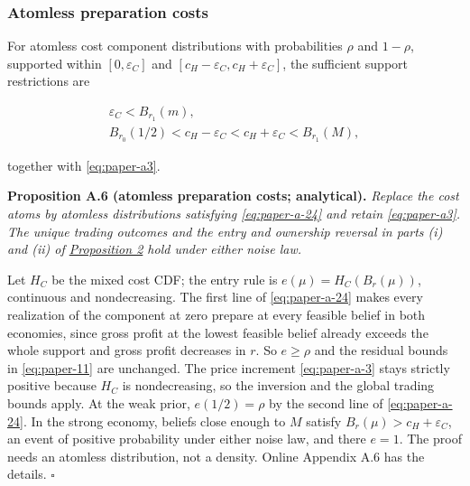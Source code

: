 \subsubsection{Atomless preparation
costs}\label{atomless-preparation-costs}

For atomless cost component distributions with
probabilities \(\rho\) and \(1-\rho\), supported within
\([0,\varepsilon_C]\) and
\([c_H-\varepsilon_C,c_H+\varepsilon_C]\), the sufficient support
restrictions are

\[
\begin{gathered}
\varepsilon_C<B_{r_1}(m),\\
B_{r_0}(1/2)<c_H-\varepsilon_C<c_H+\varepsilon_C<B_{r_1}(M),
\end{gathered}
\tag{A.24}\label{eq:paper-a-24}
\]

together with \eqref{eq:paper-a3}.


\protect{}\label{result-proposition-a-6}{\textbf{Proposition
A.6 (atomless preparation costs; analytical).}} \emph{Replace the cost
atoms by atomless distributions satisfying \eqref{eq:paper-a-24} and
retain \eqref{eq:paper-a3}. The unique trading outcomes and the entry
and ownership reversal in parts (i) and (ii) of
\hyperref[result-proposition-2]{Proposition 2} hold under either noise
law.}

Let \(H_C\) be the mixed cost CDF; the entry rule is
\(e(\mu)=H_C(B_r(\mu))\), continuous and nondecreasing. The first line
of \eqref{eq:paper-a-24} makes every realization of the component at
zero prepare at every feasible belief in both economies, since gross
profit at the lowest feasible belief already exceeds the whole support
and gross profit decreases in \(r\). So \(e\ge\rho\) and the
residual bounds in \eqref{eq:paper-11} are unchanged. The price
increment \eqref{eq:paper-a-3} stays strictly positive because \(H_C\)
is nondecreasing, so the inversion and the global trading bounds apply.
At the weak prior, \(e(1/2)=\rho\) by the second line of
\eqref{eq:paper-a-24}. In the strong economy, beliefs close enough to
\(M\) satisfy \(B_r(\mu)>c_H+\varepsilon_C\), an event of positive
probability under either noise law, and there \(e=1\). The proof needs
an atomless distribution, not a density. Online Appendix A.6 has the
details. \(\square\)
